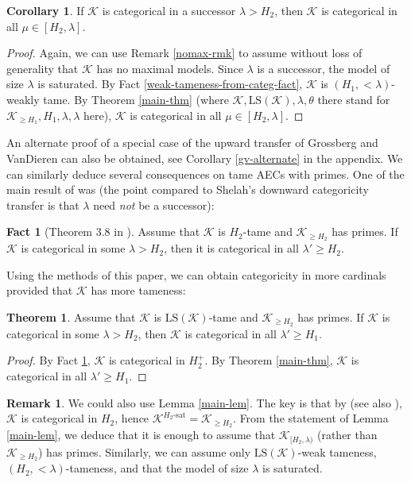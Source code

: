 \documentclass[12pt]{amsart}
\theoremstyle{definition}
\newtheorem{thm}[mydef]{Theorem}
\newtheorem{cor}[mydef]{Corollary}
\newtheorem{remark}[mydef]{Remark}
\newtheorem{fact}[mydef]{Fact}
\begin{document}
\begin{cor}\label{shelah-alternate}
  If ${\mathcal{K}}$ is categorical in a successor $\lambda > H_2$, then ${\mathcal{K}}$ is categorical in all $\mu \in [H_2, \lambda]$.
\end{cor}
\begin{proof}
  Again, we can use Remark \ref{nomax-rmk} to assume without loss of generality that ${\mathcal{K}}$ has no maximal models. Since $\lambda$ is a successor, the model of size $\lambda$ is saturated. By Fact \ref{weak-tameness-from-categ-fact}, ${\mathcal{K}}$ is $(H_1, <\lambda)$-weakly tame. By Theorem \ref{main-thm} (where ${\mathcal{K}}, {\text{LS}} ({\mathcal{K}}), \lambda, \theta$ there stand for ${\mathcal{K}}_{\ge H_1}, H_1, \lambda, \lambda$ here), ${\mathcal{K}}$ is categorical in all $\mu \in [H_2, \lambda]$.
\end{proof}

An alternate proof of a special case of the upward transfer of Grossberg and VanDieren \cite{tamenesstwo, tamenessthree} can also be obtained, see Corollary \ref{gv-alternate} in the appendix. 
We can similarly deduce several consequences on tame AECs with primes. One of the main result of \cite{categ-primes-v3} was (the point compared to Shelah's downward categoricity transfer \cite{sh394} is that $\lambda$ need \emph{not} be a successor): 

\begin{fact}[Theorem 3.8 in \cite{categ-primes-v3}]\label{prime-fact}
  Assume that ${\mathcal{K}}$ is $H_2$-tame and ${\mathcal{K}}_{\ge H_2}$ has primes. If ${\mathcal{K}}$ is categorical in some $\lambda > H_2$, then it is categorical in all $\lambda' \ge H_2$.
\end{fact}

Using the methods of this paper, we can obtain categoricity in more cardinals provided that ${\mathcal{K}}$ has more tameness:

\begin{thm}\label{improved-prime-categ}
  Assume that ${\mathcal{K}}$ is ${\text{LS}} ({\mathcal{K}})$-tame and ${\mathcal{K}}_{\ge H_2}$ has primes. If ${\mathcal{K}}$ is categorical in some $\lambda > H_2$, then ${\mathcal{K}}$ is categorical in all $\lambda' \ge H_1$.
\end{thm}
\begin{proof}
  By Fact \ref{prime-fact}, ${\mathcal{K}}$ is categorical in $H_2^+$. By Theorem \ref{main-thm}, ${\mathcal{K}}$ is categorical in all $\lambda' \ge H_1$.
\end{proof}
\begin{remark}
  We could also use Lemma \ref{main-lem}. The key is that by \cite[II.1.6]{sh394} (see also \cite[Theorem 14.9]{baldwinbook09}), ${\mathcal{K}}$ is categorical in $H_2$, hence ${{{{\mathcal{K}}}^{{{H_2}}\text{-sat}}}} = {\mathcal{K}}_{\ge H_2}$. From the statement of Lemma \ref{main-lem}, we deduce that it is enough to assume that ${\mathcal{K}}_{[H_2, \lambda)}$ (rather than ${\mathcal{K}}_{\ge H_2}$) has primes. Similarly, we can assume only ${\text{LS}} ({\mathcal{K}})$-weak tameness, $(H_2, <\lambda)$-tameness, and that the model of size $\lambda$ is saturated.
\end{remark}
\end{document}
